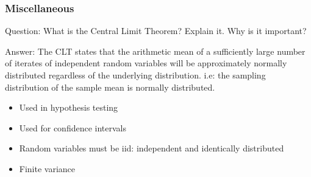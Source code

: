 \documentclass[11pt]{beamer}
\begin{document}
\begin{frame}
\frametitle{Miscellaneous}
\begin{block}{Question:}
	What is the Central Limit Theorem? Explain it. Why is it important?
\end{block}
\begin{block}{Answer:}
	The CLT states that the arithmetic mean of a sufficiently large number of iterates of independent random variables will be approximately normally distributed regardless of the underlying distribution. i.e: the sampling distribution of the sample mean is normally distributed.
		\begin{itemize}
			\item Used in hypothesis testing
			\item Used for confidence intervals
			\item Random variables must be iid: independent and identically distributed
			\item Finite variance
		\end{itemize}
\end{block}
\end{frame}
\end{document}
